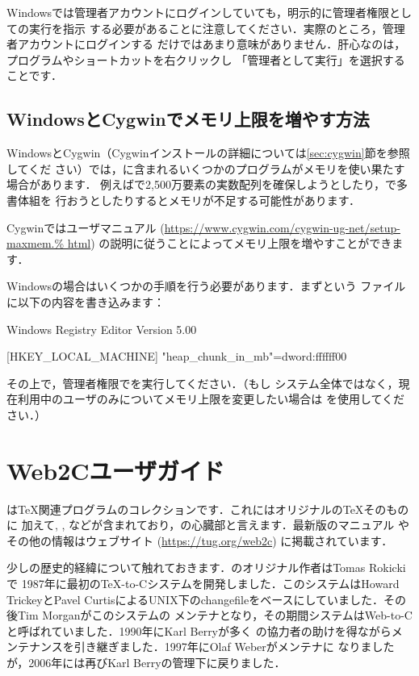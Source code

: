 \documentclass[uplatex,dvipdfmx,tombow]{jsarticle}
\begin{document}
Windowsでは管理者アカウントにログインしていても，明示的に管理者権限としての実行を指示
する必要があることに注意してください．実際のところ，管理者アカウントにログインする
だけではあまり意味がありません．肝心なのは，プログラムやショートカットを右クリックし
「管理者として実行」を選択することです．

\subsection{WindowsとCygwinでメモリ上限を増やす方法}
\label{sec:cygwin-maxmem}

WindowsとCygwin（Cygwinインストールの詳細については\ref{sec:cygwin}節を参照してくだ
さい）では，\TL に含まれるいくつかのプログラムがメモリを使い果たす場合があります．
例えばで2,500万要素の実数配列を確保しようとしたり，\LuaTeX で多書体組を
行おうとしたりするとメモリが不足する可能性があります．

Cygwinではユーザマニュアル (\url{https://www.cygwin.com/cygwin-ug-net/setup-maxmem.%
html}) の説明に従うことによってメモリ上限を増やすことができます．

Windowsの場合はいくつかの手順を行う必要があります．まずという
ファイルに以下の内容を書き込みます：
%
\begin{sverbatim}
Windows Registry Editor Version 5.00

[HKEY_LOCAL_MACHINE\Software\Cygwin]
"heap_chunk_in_mb"=dword:ffffff00
\end{sverbatim}
%
その上で，管理者権限でを実行してください．（もし
システム全体ではなく，現在利用中のユーザのみについてメモリ上限を変更したい場合は
を使用してください．）

\section{Web2Cユーザガイド}

\Webc は\TeX 関連プログラムのコレクションです．これにはオリジナルの\TeX そのものに
加えて\MF, \MP, \BibTeX などが含まれており，\TL の心臓部と言えます．最新版のマニュアル
やその他の情報はウェブサイト (\url{https://tug.org/web2c}) に掲載されています．

少し\Webc の歴史的経緯について触れておきます．\Webc のオリジナル作者はTomas Rokickiで
1987年に最初の\TeX -to-Cシステムを開発しました．このシステムはHoward TrickeyとPavel
CurtisによるUNIX下のchangefileをベースにしていました．その後Tim Morganがこのシステムの
メンテナとなり，その期間システムはWeb-to-Cと呼ばれていました．1990年にKarl Berryが多く
の協力者の助けを得ながらメンテナンスを引き継ぎました．1997年にOlaf Weberがメンテナに
なりましたが，2006年には再びKarl Berryの管理下に戻りました．
\end{document}

